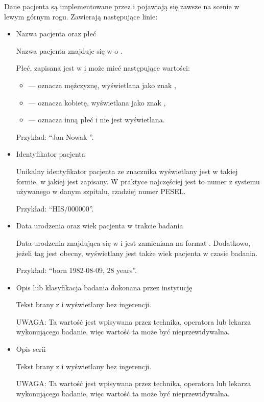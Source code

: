Dane pacjenta są implementowane przez  i pojawiają się zawsze na scenie w lewym górnym rogu.
Zawierają następujące linie:
\begin{itemize}
    \item Nazwa pacjenta oraz płeć

          Nazwa pacjenta znajduje się w  o .

          Płeć, zapisana jest w  i może mieć następujące wartości:
          \begin{itemize}
              \item {} --- oznacza mężczyznę, wyświetlana jako znak \utfMaleSign,
              \item {} --- oznacza kobietę, wyświetlana jako znak \utfFemaleSign,
              \item {} --- oznacza inną płeć i nie jest wyświetlana.
          \end{itemize}

          Przykład: \enquote{Jan Nowak \utfMaleSign}.

    \item Identyfikator pacjenta

          Unikalny identyfikator pacjenta ze znacznika  wyświetlany jest w takiej formie, w jakiej jest zapisany.
          W praktyce najczęściej jest to numer z systemu używanego w danym szpitalu, rzadziej numer PESEL.

          Przykład: \enquote{HIS/000000}.

    \item Data urodzenia oraz wiek pacjenta w trakcie badania

          Data urodzenia znajdująca się w  i jest zamieniana na format .
          Dodatkowo, jeżeli tag  jest obecny, wyświetlany jest także wiek pacjenta w czasie badania.

          Przykład: \enquote{born 1982-08-09, 28 years}.

    \item Opis lub klasyfikacja badania dokonana przez instytucję

          Tekst brany z  i wyświetlany bez ingerencji.

          UWAGA: Ta wartość jest wpisywana przez technika, operatora lub lekarza wykonującego badanie, więc wartość ta może być nieprzewidywalna.

    \item Opis serii

          Tekst brany z  i wyświetlany bez ingerencji.

          UWAGA: Ta wartość jest wpisywana przez technika, operatora lub lekarza wykonującego badanie, więc wartość ta może być nieprzewidywalna.
\end{itemize}

